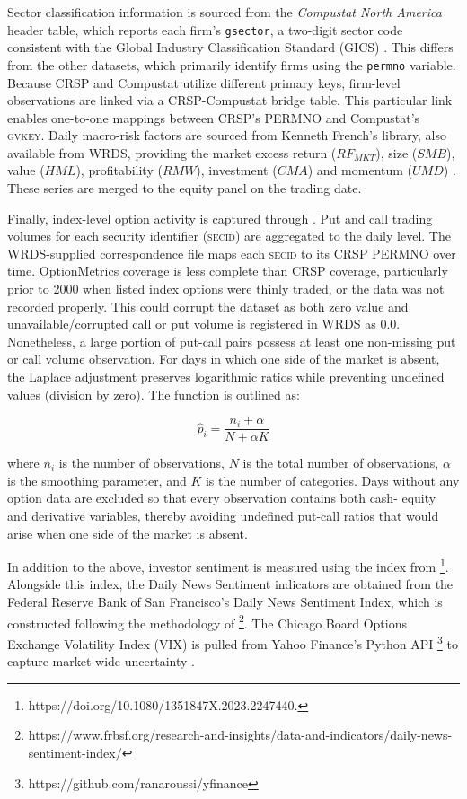 Sector classification information is sourced from the \emph{Compustat North America} header table, which reports each firm's \texttt{gsector}, a two-digit sector code consistent with the Global Industry Classification Standard (GICS) \cite{compstat}. This differs from the other datasets, which primarily identify firms using the \texttt{permno} variable. Because CRSP and Compustat utilize different primary keys, firm-level observations are linked via a CRSP-Compustat bridge table. This particular link enables one-to-one mappings between CRSP's PERMNO and Compustat's \textsc{gvkey}. Daily macro-risk factors are sourced from Kenneth French's library, also available from WRDS, providing the market excess return ($RF_{MKT}$), size ($SMB$), value ($HML$), profitability ($RMW$), investment ($CMA$) and momentum ($UMD$) \cite{ff_wrds}. These series are merged to the equity panel on the trading date.

Finally, index-level option activity is captured through . Put and call trading volumes for each security identifier (\textsc{secid}) are aggregated to the daily level. The WRDS-supplied correspondence file maps each \textsc{secid} to its CRSP PERMNO over time. OptionMetrics coverage is less complete than CRSP coverage, particularly prior to 2000 when listed index options were thinly traded, or the data was not recorded properly. This could corrupt the dataset as both zero value and unavailable/corrupted call or put volume is registered in WRDS as 0.0. Nonetheless, a large portion of put-call pairs possess at least one non-missing put or call volume observation. For days in which one side of the market is absent, the Laplace adjustment preserves logarithmic ratios while preventing undefined values (division by zero). The function is outlined as:

\begin{equation}
     \hat{p}_i = \frac{n_i + \alpha}{N + \alpha K}
     \end{equation}

where $n_i$ is the number of observations, $N$ is the total number of observations, $\alpha$ is the smoothing parameter, and $K$ is the number of categories. Days without any option data are excluded so that every observation contains both cash- equity and derivative variables, thereby avoiding undefined put-call ratios that would arise when one side of the market is absent.

In addition to the above, investor sentiment is measured using the index from \footnote{https://doi.org/10.1080/1351847X.2023.2247440.}. Alongside this index, the Daily News Sentiment indicators are obtained from the Federal Reserve Bank of San Francisco's Daily News Sentiment Index, which is constructed following the methodology of  \footnote{https://www.frbsf.org/research-and-insights/data-and-indicators/daily-news-sentiment-index/}. The Chicago Board Options Exchange Volatility Index (VIX) is pulled from Yahoo Finance's Python API \footnote{https://github.com/ranaroussi/yfinance} to capture market-wide uncertainty \cite{vix_cboe}. 
 

